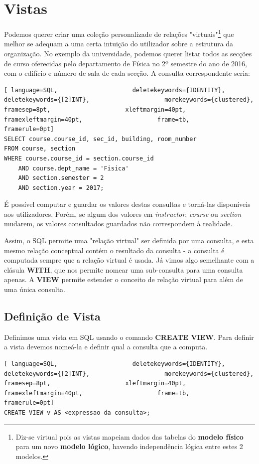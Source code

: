 \documentclass[oneside]{book}
\theoremstyle{definition}
\begin{document}
\section{Vistas}
Podemos querer criar uma coleção personalizade de relações "virtuais"\footnote{Diz-se virtual pois as vistas mapeiam dados das tabelas do \textbf{modelo físico} para um novo \textbf{modelo lógico}, havendo independência lógica entre estes 2 modelos.} que melhor se adequam a uma certa intuição do utilizador sobre a estrutura da organização. No exemplo da universidade, podemos querer listar todos as secções de curso oferecidas pelo departamento de Física no 2º semestre do ano de 2016, com o edifício e número de sala de cada secção. A consulta correspondente seria:
\begin{lstlisting}[ language=SQL,                     deletekeywords={IDENTITY},                     deletekeywords={[2]INT},                     morekeywords={clustered},                     framesep=8pt,                     xleftmargin=40pt,                     framexleftmargin=40pt,                     frame=tb,                     framerule=0pt]
SELECT course.course_id, sec_id, building, room_number
FROM course, section
WHERE course.course_id = section.course_id
    AND course.dept_name = 'Fisica'
    AND section.semester = 2
    AND section.year = 2017;
\end{lstlisting}
É possível computar e guardar os valores destas consultas e torná-las disponíveis aos utilizadores. Porém, se algum dos valores em \textit{instructor}, \textit{course} ou \textit{section} mudarem, os valores consultados guardados não correspondem à realidade.

Assim, o SQL permite uma "relação virtual" ser definida por uma consulta, e esta mesmo relação conceptual contém o resultado da consulta - a consulta é computada sempre que a relação virtual é usada. Já vimos algo semelhante com a clásula \textbf{WITH}, que nos permite nomear uma sub-consulta para uma consulta apenas. A \textbf{VIEW} permite estender o conceito de relação virtual para além de uma única consulta.

\subsection{Definição de Vista}
Definimos uma vista em SQL usando o comando \textbf{CREATE VIEW}. Para definir a vista devemos nomeá-la e definir qual a consulta que a computa.
\begin{lstlisting}[ language=SQL,                     deletekeywords={IDENTITY},                     deletekeywords={[2]INT},                     morekeywords={clustered},                     framesep=8pt,                     xleftmargin=40pt,                     framexleftmargin=40pt,                     frame=tb,                     framerule=0pt]
CREATE VIEW v AS <expressao da consulta>;
\end{lstlisting}
\end{document}
